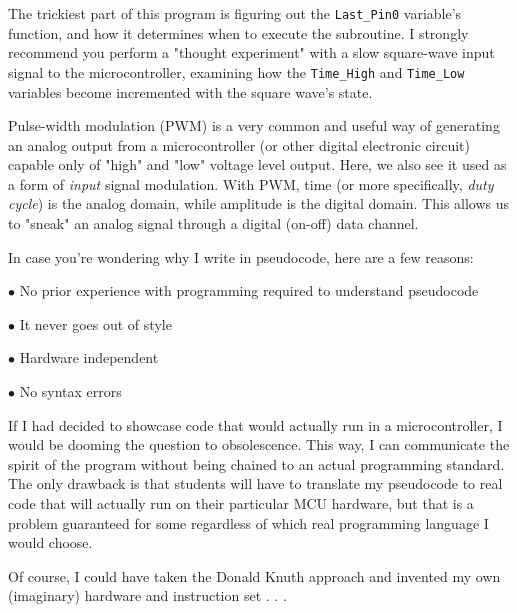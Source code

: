 





The trickiest part of this program is figuring out the {\tt Last\_Pin0} variable's function, and how it determines when to execute the subroutine.  I strongly recommend you perform a "thought experiment" with a slow square-wave input signal to the microcontroller, examining how the {\tt Time\_High} and {\tt Time\_Low} variables become incremented with the square wave's state.







Pulse-width modulation (PWM) is a very common and useful way of generating an analog output from a microcontroller (or other digital electronic circuit) capable only of "high" and "low" voltage level output.  Here, we also see it used as a form of {\it input} signal modulation.  With PWM, time (or more specifically, {\it duty cycle}) is the analog domain, while amplitude is the digital domain.  This allows us to "sneak" an analog signal through a digital (on-off) data channel.

\vskip 10pt

In case you're wondering why I write in pseudocode, here are a few reasons:

\medskip
\goodbreak
\item{$\bullet$} No prior experience with programming required to understand pseudocode
\item{$\bullet$} It never goes out of style
\item{$\bullet$} Hardware independent
\item{$\bullet$} No syntax errors
\medskip

If I had decided to showcase code that would actually run in a microcontroller, I would be dooming the question to obsolescence.  This way, I can communicate the spirit of the program without being chained to an actual programming standard.  The only drawback is that students will have to translate my pseudocode to real code that will actually run on their particular MCU hardware, but that is a problem guaranteed for some regardless of which real programming language I would choose.

Of course, I could have taken the Donald Knuth approach and invented my own (imaginary) hardware and instruction set . . . 




